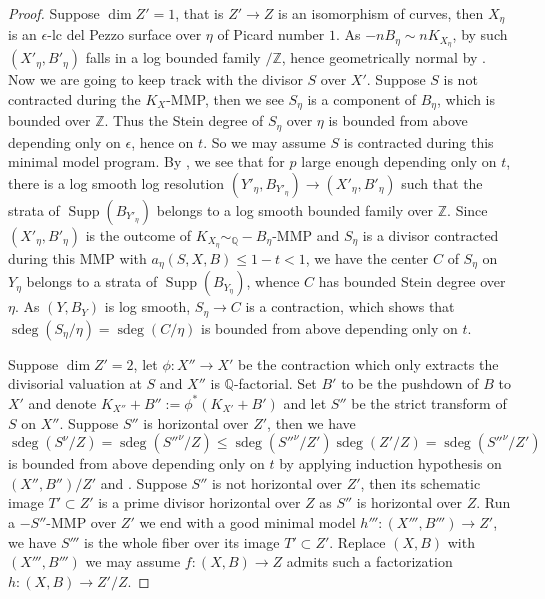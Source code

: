 \documentclass[letterpaper,reqno,12pt]{amsart}
\DeclareMathOperator{\Supp}{Supp}
\DeclareMathOperator{\sdeg}{sdeg}
\numberwithin{equation}{section}
\theoremstyle{plain}
\begin{document}
\begin{proof}
    Suppose $\dim Z'=1$, that is $Z'\to Z$ is an isomorphism of curves, then $X_\eta$ is an $\epsilon$-lc del Pezzo surface over $\eta$ of Picard number $1$. As $-nB_{\eta}\sim nK_{X_\eta}$, by \cite{bernasconi2024boundinggeometricallyintegraldel} such $(X'_\eta,B'_\eta)$ falls in a log bounded family $/\mathbb Z$, hence geometrically normal by . Now we are going to keep track with the divisor $S$ over $X'$. Suppose $S$ is not contracted during the $K_X$-MMP, then we see $S_\eta$ is a component of $B_\eta$, which is bounded over $\mathbb Z$. Thus the Stein degree of $S_\eta$ over $\eta$ is bounded from above depending only on $\epsilon$, hence on $t$. So we may assume $S$ is contracted during this minimal model program. By , we see that for $p$ large enough depending only on $t$, there is a log smooth log resolution $(Y'_\eta,B_{Y'_\eta})\to (X'_\eta,B'_\eta)$ such that the strata of $\Supp(B_{Y'_\eta})$ belongs to a log smooth bounded family over $\mathbb Z$. Since $(X'_\eta,B'_\eta)$ is the outcome of $K_{X_\eta}\sim_\mathbb Q-B_\eta$-MMP and $S_\eta$ is a divisor contracted during this MMP with $a_\eta(S,X,B)\leq 1-t<1$, we have the center $C$ of $S_\eta$ on $Y_\eta$ belongs to a strata of $\Supp(B_{Y_\eta})$, whence $C$ has bounded Stein degree over $\eta$. As $(Y,B_Y)$ is log smooth, $S_\eta\to C$ is a contraction, which shows that $\sdeg(S_\eta/\eta)=\sdeg(C/\eta)$ is bounded from above depending only on $t$.
    
    Suppose $\dim Z'=2$, let $\phi:X''\to X'$ be the contraction which only extracts the divisorial valuation at $S$ and $X''$ is $\mathbb Q$-factorial. Set $B'$ to be the pushdown of $B$ to $X'$ and denote $K_{X''}+B'':=\phi^*(K_{X'}+B')$ and let $S''$ be the strict transform of $S$ on $X''$. Suppose $S''$ is horizontal over $Z'$, then we have
    \[\sdeg(S^\nu/Z)=\sdeg (S''^\nu/Z)\leq\sdeg(S''^\nu/Z')\sdeg(Z'/Z)=\sdeg(S''^\nu/Z')\]
    is bounded from above depending only on $t$ by applying induction hypothesis on $(X'',B'')/Z'$ and . Suppose $S''$ is not horizontal over $Z'$, then  its schematic image $T'\subset Z'$ is a prime divisor horizontal over $Z$ as $S''$ is horizontal over $Z$.  Run a $-S''$-MMP over $Z'$ we end with a good minimal model $h''':(X''',B''')\to Z'$, we have  $S'''$ is the whole fiber over its image $T'\subset Z'$. Replace $(X,B)$ with $(X''',B''')$ we may assume $f:(X,B)\to Z$ admits such a factorization $h:(X,B)\to Z'/Z$.


\end{proof}
\end{document}

